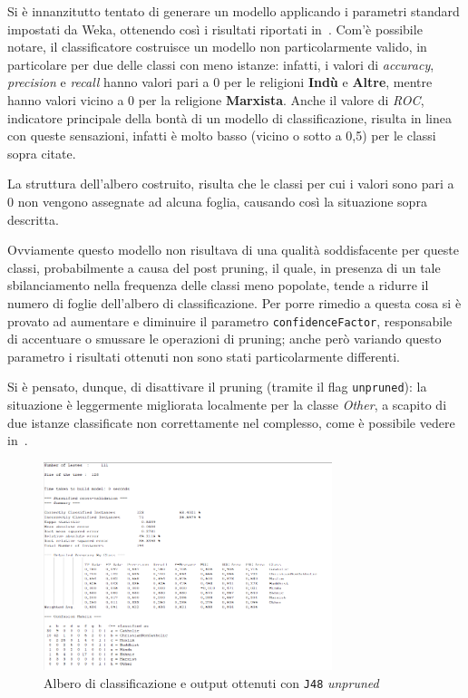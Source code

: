 \documentclass[a4paper,11pt,twoside,notitlepage,final]{scrartcl}
\begin{document}
Si è innanzitutto tentato di generare un modello applicando i parametri standard impostati da Weka, ottenendo così i risultati riportati in~.
Com'è possibile notare, il classificatore costruisce un modello non particolarmente valido, in particolare per due delle classi con meno istanze:
infatti, i valori di \emph{accuracy}, \emph{precision} e \emph{recall} hanno valori pari a \(0\) per le religioni \textbf{Indù} e \textbf{Altre}, mentre hanno valori vicino a \(0\) per la religione \textbf{Marxista}.
Anche il valore di \emph{ROC}, indicatore principale della bontà di un modello di classificazione, risulta in linea con queste sensazioni, infatti è molto basso (vicino o sotto a 0,5) per le classi sopra citate.

La struttura dell'albero costruito, risulta che le classi per cui i valori sono pari a \(0\) non vengono assegnate ad alcuna foglia, causando
così la situazione sopra descritta.

Ovviamente questo modello non risultava di una qualità soddisfacente per queste classi, probabilmente a causa del post pruning,
il quale, in presenza di un tale sbilanciamento nella frequenza delle classi meno popolate, tende a ridurre il numero di foglie dell'albero di classificazione.
Per porre rimedio a questa cosa si è provato ad aumentare e diminuire il parametro \texttt{confidenceFactor}, responsabile di accentuare o smussare le operazioni di pruning;
anche però variando questo parametro i risultati ottenuti non sono stati particolarmente differenti.

Si è pensato, dunque, di disattivare il pruning (tramite il flag \texttt{unpruned}): la situazione è leggermente migliorata localmente per la classe \emph{Other},
a scapito di due istanze classificate non correttamente nel complesso, come è possibile vedere in~.


\begin{figure}[H]
  \centering
  \includegraphics[width=0.75\textwidth]{fig/DecisionTree2.PNG}%
  \caption{Albero di classificazione e output ottenuti con \texttt{J48} \emph{unpruned}}%
  \label{fig:j48}
\end{figure}
\end{document}
